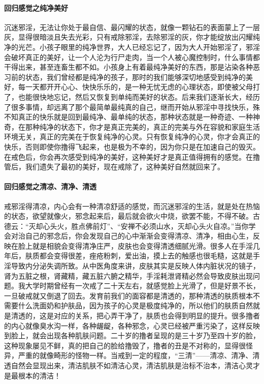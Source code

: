 \paragraph{回归感觉之纯净美好}

沉迷邪淫，无法让你处于最自信、最闪耀的状态，就像一颗钻石的表面蒙上了一层灰，显得很暗淡且失去光彩，只有戒除邪淫，去除邪淫的灰，你才能绽放出闪耀纯净的光芒。小孩子眼里的纯净世界，大人已经忘记了，因为大人开始邪淫了，邪淫会破坏真正的美好，让一个人沦为行尸走肉，当一个人被心魔控制时，什么事情都干得出来，甚至连畜生都不如。小孩身上有着最纯净美好的东西，那是沾染各种恶习前的状态，我们曾经都是纯净的孩子，那时的我们能够深切地感受到纯净的美好，每一天都开开心心、快快乐乐的，是一种无忧无虑的心理状态，即使被父母打了，也能很快地忘记，然后又恢复到单纯而美好的状态。后来我们逐渐长大，经历了很多事情，却远离了那个最简单最纯真的自己，继而开始从邪淫中寻找快乐，殊不知真正的快乐就是回到最纯净、最单纯的状态，那种状态就是一种奇迹、一种神奇，在那种纯净的状态下，你才是真正完美的，真正的完美与外在容貌和家庭生活环境无关，真正的完美在于恢复纯净的心灵。只有恢复纯净的心灵，你才会真正的快乐，否则即使你撸得飞起来，也是极为不幸的，因为你只是在加速自己的毁灭。在戒色后，你会再次感受到纯净的美好，这种美好才是真正值得拥有的感觉。在撸管后，我们遗失了最初的美好，现在戒除了，这种美好自然就回来了。

\paragraph{回归感觉之清凉、清净、清透}

戒邪淫得清凉，内心会有一种清凉舒适的感觉，而沉迷邪淫的生活，就是处在热恼的状态，欲望就像火，邪念起来后，最后就会欲火中烧，欲罢不能，不得不破。古德云：“灭却心头火，胜点佛前灯”、“安禅不必须山水，灭却心头火自凉。”当你学会对治自己的邪念后，你会发现自己的心中渐渐会变得清凉、清净，相由心生，反映在脸上就是相貌会变得清净庄严，皮肤也会变得清透细腻光滑。很多人在手淫几年后，肤质都会变得很差，痤疮粉刺，爱出油，摸上去的触感也很毛糙，这就是手淫导致内分泌失调所致。从中医角度来讲，皮肤其实是反映人体内脏状况的镜子，肾为五脏之根，肾藏精，藏五脏六腑之精华，手淫耗泄肾精必然会导致皮肤出现问题。我大学时期曾经有一次戒了二十天左右，就感觉脸上光滑了，但是好景不长，一旦破戒就又倒退了回去。发育前我们的面容都是清透的，那种清透的肤质根本不需要什么洗面奶和护肤品，因为孩子的心灵是极度纯净的，所以他们的肤质自然就是清透的，这是对应的关系，把心弄干净了，肤质也会得到明显的提升。很多撸者的内心就像臭水沟一样，各种龌龊，各种邪念，心灵已经被严重污染了，这样反映到脸上，就会出现各种肌肤问题。二十岁的撸者呈现的是三十岁乃至四十岁的脸，这种现象屡见不鲜，真的把自己的脸给撸毁了，撸者的丑是不对称的，显得很怪异，严重的就像畸形的怪物一样。当戒到一定的程度，“三清”——清凉、清净、清透自然会显现出来，清洁肌肤不如清洁心灵，清洁肌肤是治标不治本，清洁心灵才是最根本的清洁！

